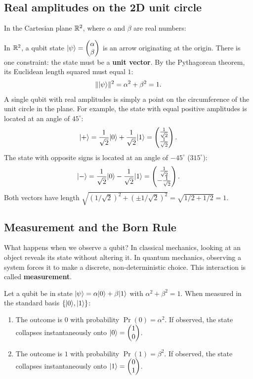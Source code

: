\subsection{Real amplitudes on the 2D unit circle}

In the Cartesian plane $\mathbb{R}^2$, where $\alpha$ and $\beta$ are real numbers:

In $\mathbb{R}^2$, a qubit state $\lvert \psi \rangle = \begin{pmatrix}\alpha \\ \beta\end{pmatrix}$ is an arrow
originating at the origin. There is one constraint: the state
must be a \textbf{unit vector}. By the Pythagorean theorem, its Euclidean length
squared must equal $1$:
\[
  \lVert \lvert \psi \rangle \rVert^2 = \alpha^2 + \beta^2 = 1.
\]
A single qubit with real amplitudes is simply a point on the circumference of the
unit circle in the plane. For example, the state with equal positive amplitudes
is located at an angle of $45^\circ$:
\[
  \lvert + \rangle = \frac{1}{\sqrt{2}}\lvert 0 \rangle + \frac{1}{\sqrt{2}}\lvert 1 \rangle
  = \begin{pmatrix}\frac{1}{\sqrt{2}} \\ \frac{1}{\sqrt{2}}\end{pmatrix}.
\]
The state with opposite signs is located at an angle of $-45^\circ$ ($315^\circ$):
\[
  \lvert - \rangle = \frac{1}{\sqrt{2}}\lvert 0 \rangle - \frac{1}{\sqrt{2}}\lvert 1 \rangle
  = \begin{pmatrix}\frac{1}{\sqrt{2}} \\ -\frac{1}{\sqrt{2}}\end{pmatrix}.
\]
Both vectors have length $\sqrt{(1/\sqrt{2})^2 + (\pm 1/\sqrt{2})^2} = \sqrt{1/2 + 1/2} = 1$.

\subsection{Measurement and the Born Rule}

What happens when we observe a qubit? In classical mechanics, looking at an object
reveals its state without altering it. In quantum mechanics, observing a system
forces it to make a discrete, non-deterministic choice. This interaction is called
\textbf{measurement}.

\begin{definition}
Let a qubit be in state $\lvert \psi \rangle = \alpha\lvert 0 \rangle + \beta\lvert 1 \rangle$ with
$\alpha^2 + \beta^2 = 1$. When measured in the standard basis $\{\lvert 0 \rangle, \lvert 1 \rangle\}$:
\begin{enumerate}
  \item The outcome is $0$ with probability $\Pr(0) = \alpha^2$. If observed, the
  state collapses instantaneously onto $\lvert 0 \rangle = \begin{pmatrix}1\\0\end{pmatrix}$.
  \item The outcome is $1$ with probability $\Pr(1) = \beta^2$. If observed, the
  state collapses instantaneously onto $\lvert 1 \rangle = \begin{pmatrix}0\\1\end{pmatrix}$.
\end{enumerate}
\end{definition}

